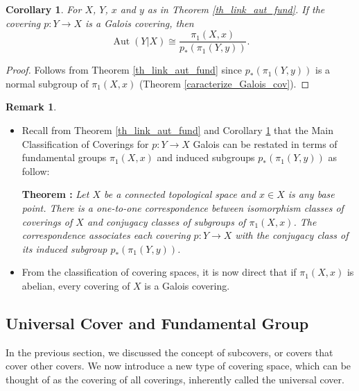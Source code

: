 \documentclass{article}
\theoremstyle{plain}
\newtheorem{corollary}[theorem]{Corollary}
\theoremstyle{definition}
\newtheorem{remark}{Remark}
\DeclareMathOperator{\Aut}{Aut}
\begin{document}
\begin{corollary}
\label{co_link_aut_fund}
    For $X$, $Y$, $x$ and $y$ as in Theorem \ref{th_link_aut_fund}. If the covering $p:Y\rightarrow X$ is a Galois covering, then 
    $$\Aut(Y|X) \cong \frac{\pi_1(X,x)}{p_*(\pi_1(Y,y))}.$$
\end{corollary}
\begin{proof}
    Follows from Theorem \ref{th_link_aut_fund} since $p_*(\pi_1(Y,y))$ is a normal subgroup of $\pi_1(X,x)$ (Theorem \ref{caracterize_Galois_cov}).
\end{proof}

\begin{remark}\textbf{ }
    \begin{itemize}
        \item[$a)$] Recall from Theorem \ref{th_link_aut_fund} and Corollary \ref{co_link_aut_fund} that the Main Classification of Coverings for $p:Y\rightarrow X$ Galois can be restated in terms of fundamental groups $\pi_1(X,x)$ and induced subgroups $p_*(\pi_1(Y,y))$ as follow:

        \hspace*{2mm} \textbf{Theorem :} \textit{Let $X$ be a connected topological space and $x\in X$ is any base point.
        There is a one-to-one correspondence between isomorphism classes of coverings of $X$ and conjugacy classes of subgroups of $\pi_1(X,x)$.
        The correspondence associates each covering $p:Y\rightarrow X$ with the conjugacy class of its induced subgroup $p_*(\pi_1(Y,y))$.}
        

        \item[$b)$] From the classification of covering spaces, it is now direct that if $\pi_1(X,x)$ is abelian, every covering of $X$ is a Galois covering.\\
    \end{itemize}
\end{remark}











\subsection{Universal Cover and Fundamental Group}
\label{universal_cover_section}

In the previous section, we discussed the concept of subcovers, or covers that cover other covers. 
We now introduce a new type of covering space, which can be thought of as the covering of all coverings, inherently called the universal cover. 
\end{document}
